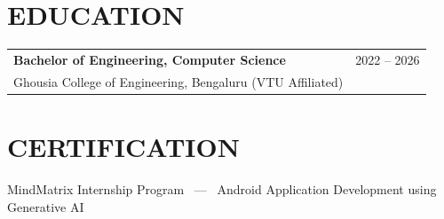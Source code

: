 \documentclass[10.5pt,a4paper]{article}
\begin{document}
\section*{EDUCATION}
\begin{tabularx}{\textwidth}{@{}X r@{}}
\textbf{Bachelor of Engineering, Computer Science} & 2022 -- 2026 \\
Ghousia College of Engineering, Bengaluru (VTU Affiliated) & \\
\end{tabularx}

\section*{CERTIFICATION}
MindMatrix Internship Program \ — \ Android Application Development using Generative AI
\end{document}
